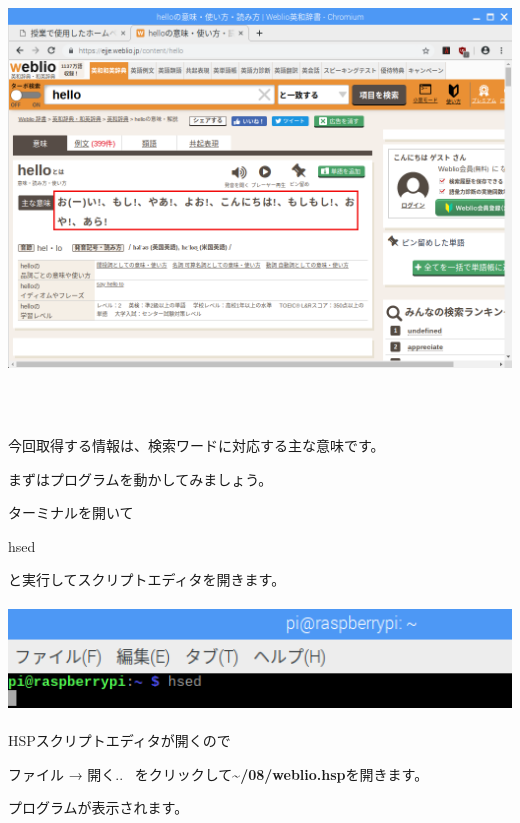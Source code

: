 \documentclass[a4paper,12pt,dvipdfmx]{jarticle}
\begin{document}
\begin{center}
\includegraphics[width=17.006cm,height=12.157cm]{textbook-img046.png}

\end{center}
今回取得する情報は、検索ワードに対応する主な意味です。

まずはプログラムを動かしてみましょう。

ターミナルを開いて

hsed

と実行してスクリプトエディタを開きます。



\begin{center}
\includegraphics[width=17.057cm,height=2.866cm]{textbook-img013.png}

\end{center}
\clearpage
HSPスクリプトエディタが開くので

ファイル → 開く..
\ をクリックして\textbf{\~{}/08/weblio.hsp}を開きます。

プログラムが表示されます。
\end{document}

